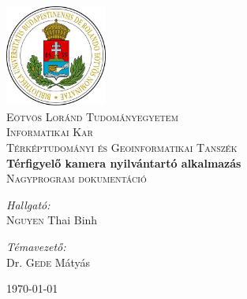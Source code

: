 \documentclass[final]{book}
\begin{document}
	\begin{titlepage}

	\begin{center}


	\includegraphics[width=0.25\textwidth]{./logo}\\[1cm]

	\textsc{ Eötvös Loránd Tudományegyetem \\
	Informatikai Kar
	\\
	Térképtudományi és Geoinformatikai Tanszék
	}\\[2.5cm]
	

	
	{ \huge \bfseries Térfigyelő kamera nyilvántartó alkalmazás}\\[0.4cm]
	
	\textsc{Nagyprogram dokumentáció}\\[2.5cm]
	
	\begin{minipage}{0.4\textwidth}
	\begin{flushleft}
	\emph{Hallgató:}\\
	\textsc{Nguyen} Thai Binh
	\end{flushleft}
	\end{minipage}
	\begin{minipage}{0.4\textwidth}
	\begin{flushright}
	\emph{Témavezető:} \\
	Dr. \textsc{Gede} Mátyás
	\end{flushright}
	\end{minipage}

	\vfill

	{\large \today}

	\end{center}

	\end{titlepage}
	

	\tableofcontents
	
	

	
	
	
	
	
\end{document}

